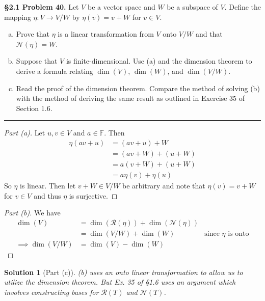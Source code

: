 \documentclass[leqno]{article}
\theoremstyle{nonumberplain}
\newtheorem{proof}{Proof}
\newtheorem{solution}{Solution}
\begin{document}
\noindent\textbf{\S 2.1 Problem 40.} Let $V$ be a vector space and $W$ be a subspace of $V$. Define the mapping $\eta \colon V \to V/W$ by $\eta(v)=v+W$ for $v\in V$.
\begin{enumerate}[(a)]
\item Prove that $\eta$ is a linear transformation from $V$ onto $V/W$ and that $\mathcal{N}(\eta)=W$.
\item Suppose that $V$ is finite-dimensional. Use (a) and the dimension theorem to derive a formula relating $\dim(V)$, $\dim(W)$, and $\dim(V/W)$.
\item Read the proof of the dimension theorem.  Compare the method of solving (b) with the method of deriving the same result as outlined in Exercise 35 of Section 1.6.
\end{enumerate}


\noindent\rule[0.5ex]{\linewidth}{1pt}

\begin{proof}[Part (a)]
Let $u,v\in V$ and $a\in \mathbb{F}$. Then
\begin{align*}
\eta(av+u)&=(av+u)+W\\
&=(av+W)+(u+W)\\
&=a(v+W)+(u+W)\\
&=a\eta(v)+\eta(u)
\end{align*}
So $\eta$ is linear. Then let $v+W\in V/W$ be arbitrary and note that $\eta(v)=v+W$ for $v\in V$ and thus $\eta$ is surjective.
\end{proof}

\begin{proof}[Part (b)]
We have
\begin{align*}
\dim(V)&=\dim(\mathcal{R}(\eta))+\dim(\mathcal{N}(\eta))\\
&=\dim(V/W)+\dim(W) &\textrm{since $\eta$ is onto}\\
\implies \dim(V/W)&=\dim(V)-\dim(W)
\end{align*}
\end{proof}

\begin{solution}[Part (c)]
(b) uses an onto linear transformation to allow us to utilize the dimension theorem. But Ex. 35 of \S 1.6 uses an argument which involves constructing bases for $\mathcal{R}(T)$ and $\mathcal{N}(T)$.
\end{solution}

\pagebreak
\end{document}
